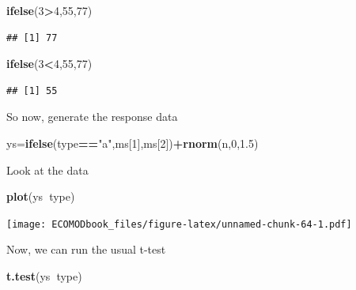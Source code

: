 \documentclass[
]{book}
\newenvironment{Shaded}{\begin{snugshade}}{\end{snugshade}}
\newcommand{\DecValTok}[1]{\textcolor[rgb]{0.00,0.00,0.81}{#1}}
\newcommand{\FloatTok}[1]{\textcolor[rgb]{0.00,0.00,0.81}{#1}}
\newcommand{\KeywordTok}[1]{\textcolor[rgb]{0.13,0.29,0.53}{\textbf{#1}}}
\newcommand{\NormalTok}[1]{#1}
\newcommand{\OperatorTok}[1]{\textcolor[rgb]{0.81,0.36,0.00}{\textbf{#1}}}
\newcommand{\StringTok}[1]{\textcolor[rgb]{0.31,0.60,0.02}{#1}}
\begin{document}
\begin{Shaded}
\begin{Highlighting}[]
\KeywordTok{ifelse}\NormalTok{(}\DecValTok{3}\OperatorTok{>}\DecValTok{4}\NormalTok{,}\DecValTok{55}\NormalTok{,}\DecValTok{77}\NormalTok{)}
\end{Highlighting}
\end{Shaded}

\begin{verbatim}
## [1] 77
\end{verbatim}

\begin{Shaded}
\begin{Highlighting}[]
\KeywordTok{ifelse}\NormalTok{(}\DecValTok{3}\OperatorTok{<}\DecValTok{4}\NormalTok{,}\DecValTok{55}\NormalTok{,}\DecValTok{77}\NormalTok{)}
\end{Highlighting}
\end{Shaded}

\begin{verbatim}
## [1] 55
\end{verbatim}

So now, generate the response data

\begin{Shaded}
\begin{Highlighting}[]
\NormalTok{ys=}\KeywordTok{ifelse}\NormalTok{(type}\OperatorTok{==}\StringTok{"a"}\NormalTok{,ms[}\DecValTok{1}\NormalTok{],ms[}\DecValTok{2}\NormalTok{])}\OperatorTok{+}\KeywordTok{rnorm}\NormalTok{(n,}\DecValTok{0}\NormalTok{,}\FloatTok{1.5}\NormalTok{)}
\end{Highlighting}
\end{Shaded}

Look at the data

\begin{Shaded}
\begin{Highlighting}[]
\KeywordTok{plot}\NormalTok{(ys}\OperatorTok{~}\NormalTok{type)}
\end{Highlighting}
\end{Shaded}

\texttt{[image: ECOMODbook\_files/figure-latex/unnamed-chunk-64-1.pdf]}

Now, we can run the usual t-test

\begin{Shaded}
\begin{Highlighting}[]
\KeywordTok{t.test}\NormalTok{(ys}\OperatorTok{~}\NormalTok{type)}
\end{Highlighting}
\end{Shaded}
\end{document}
